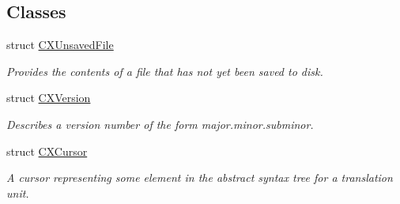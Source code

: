\subsection*{Classes}
\begin{DoxyCompactItemize}
\item 
struct \mbox{\hyperlink{structCXUnsavedFile}{C\+X\+Unsaved\+File}}
\begin{DoxyCompactList}\small\item\em Provides the contents of a file that has not yet been saved to disk. \end{DoxyCompactList}\item 
struct \mbox{\hyperlink{structCXVersion}{C\+X\+Version}}
\begin{DoxyCompactList}\small\item\em Describes a version number of the form major.\+minor.\+subminor. \end{DoxyCompactList}\item 
struct \mbox{\hyperlink{structCXCursor}{C\+X\+Cursor}}
\begin{DoxyCompactList}\small\item\em A cursor representing some element in the abstract syntax tree for a translation unit. \end{DoxyCompactList}\end{DoxyCompactItemize}
